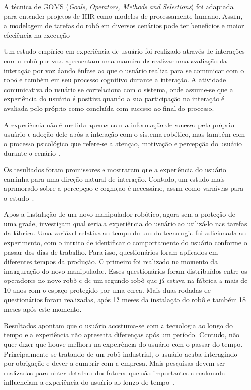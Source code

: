 A técnica de GOMS (\emph{Goals, Operators, Methods and Selections}) foi adaptada para entender projetos de IHR como modelos de processamento humano. Assim, a modelagem de tarefas do robô em diversos cenários pode ter benefícios e maior efeciência na execução~\cite{drury:2007}.

Um estudo empírico em experiência de usuário foi realizado através de interações com o robô por voz.  apresentam uma maneira de realizar uma avaliação da interação por voz dando ênfase ao que o usuário realiza para se comunicar com o robô e também em seu processo cognitivo durante a interação. A atividade comunicativa do usuário se correlaciona com o sistema, onde assume-se que a experiência do usuário é positiva quando a sua participação na interação é avaliada pelo próprio como concluída com sucesso ao final do processo.

A experiência não é medida apenas com a informação de sucesso pelo próprio usuário e adoção dele após a interação com o sistema robótico, mas também com o processo psicológico que refere-se a atenção, motivação e percepção do usuário durante o cenário~\cite{jokinen:2013}.

Os resultados foram promissores e mostraram que a experiência do usuário caminha para uma direção natural de interação. Contudo, um estudo mais aprimorado sobre a percepção e cognição é necessário, assim como variáveis para o estudo~\cite{jokinen:2013}.

Após a instalação de um novo manipulador robótico, agora sem a proteção de uma grade,  investigam qual seria a experiência do usuário ao utilizá-lo nas tarefas da fábrica. Uma variável relativa ao tempo de uso da tecnologia foi adicionada ao experimento, com o intuito de identificar o comportamento do usuário conforme o passar dos dias de trabalho. Para isso, questionários foram aplicados em diferentes tempos da produção. O primeiro foi realizado no momento da inauguração do novo manipulador. Esses questionários foram distribuídos entre os operadores no novo robô e de um segundo robô que já estava na fábrica a mais de 10 anos com o espaço protegido por uma cerca. Mais duas rodadas de questionários foram realizadas, após 12 meses da instalação do robô e também 18 meses após este momento.

Resultados apontam que o usuário acostuma-se com a tecnologia ao longo do tempo e a experiência não apresenta diferenças após um período. Contudo, não quer dizer que houve melhora na expeirência do usuário com o passar do tempo. Principalmente se tratando de um robô industrial, o usuário acaba interagindo por obrigação e dever a cumprir com a empresa. Mais pesquisas devem ser realizadas para obter detalhes dos fatores que são importantes e realmente influenciam a experiência do usuário ao longo do tempo~\cite{buchner:2013}.

